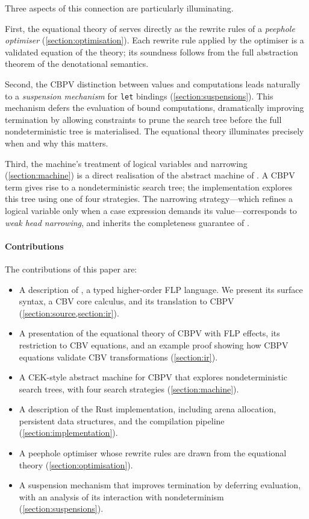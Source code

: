 Three aspects of this connection are particularly illuminating.

First, the equational theory of \parencite{jones_2026} serves directly as the
rewrite rules of a \emph{peephole optimiser}
(\cref{section:optimisation}). Each rewrite rule applied by the optimiser is a
validated equation of the theory; its soundness follows from the full abstraction
theorem of the denotational semantics.

Second, the CBPV distinction between values and computations leads naturally to a
\emph{suspension mechanism} for \texttt{let} bindings
(\cref{section:suspensions}). This mechanism defers the evaluation of bound
computations, dramatically improving termination by allowing constraints to prune
the search tree before the full nondeterministic tree is materialised. The
equational theory illuminates precisely when and why this matters.

Third, the machine's treatment of logical variables and narrowing
(\cref{section:machine}) is a direct realisation of the abstract machine of
\parencite{jones_2026}. A CBPV term gives rise to a nondeterministic search
tree; the implementation explores this tree using one of four strategies. The
narrowing strategy---which refines a logical variable only when a case expression
demands its value---corresponds to \emph{weak head narrowing}, and inherits the
completeness guarantee of \parencite{jones_2026}.

\paragraph{Contributions}

The contributions of this paper are:
\begin{itemize}
  \item A description of \Gweek{}, a typed higher-order FLP language. We present
    its surface syntax, a CBV core calculus, and its translation to CBPV
    (\cref{section:source,section:ir}).
  \item A presentation of the equational theory of CBPV with FLP effects, its
    restriction to CBV equations, and an example proof showing how CBPV equations
    validate CBV transformations (\cref{section:ir}).
  \item A CEK-style abstract machine for CBPV that explores nondeterministic
    search trees, with four search strategies (\cref{section:machine}).
  \item A description of the Rust implementation, including arena allocation,
    persistent data structures, and the compilation pipeline
    (\cref{section:implementation}).
  \item A peephole optimiser whose rewrite rules are drawn from the equational
    theory (\cref{section:optimisation}).
  \item A suspension mechanism that improves termination by deferring
    evaluation, with an analysis of its interaction with nondeterminism
    (\cref{section:suspensions}).
\end{itemize}
